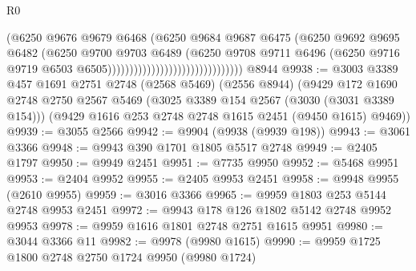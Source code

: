 \begin{lexlean}{R0}
\begin{coremodule}
                                                      (@6250
                                                        @9676
                                                        @9679
                                                        @6468
                                                        (@6250
                                                          @9684
                                                          @9687
                                                          @6475
                                                          (@6250
                                                            @9692
                                                            @9695
                                                            @6482
                                                            (@6250
                                                              @9700
                                                              @9703
                                                              @6489
                                                              (@6250
                                                                @9708
                                                                @9711
                                                                @6496
                                                                (@6250
                                                                  @9716
                                                                  @9719
                                                                  @6503
                                                                  @6505)))))))))))))))))))))))))))))))
    @8944
@9938 := @3003
    @3389
    @457
    @1691
    @2751
    @2748
    (@2568 @5469)
    (@2556 @8944)
    (@9429
      @172
      @1690
      @2748
      @2750
      @2567
      @5469
      (@3025 @3389 @154 @2567 (@3030 (@3031 @3389 @154)))
      (@9429 @1616 @253 @2748 @2748 @1615 @2451 (@9450 @1615) @9469))
@9939 := @3055 @2566
@9942 := @9904 (@9938 (@9939 @198))
@9943 := @3061 @3366
@9948 := @9943 @390 @1701 @1805 @5517 @2748
@9949 := @2405 @1797
@9950 := @9949 @2451
@9951 := @7735 @9950
@9952 := @5468 @9951
@9953 := @2404 @9952
@9955 := @2405 @9953 @2451
@9958 := @9948 @9955 (@2610 @9955)
@9959 := @3016 @3366
@9965 := @9959 @1803 @253 @5144 @2748 @9953 @2451
@9972 := @9943 @178 @126 @1802 @5142 @2748 @9952 @9953
@9978 := @9959 @1616 @1801 @2748 @2751 @1615 @9951
@9980 := @3044 @3366 @11
@9982 := @9978 (@9980 @1615)
@9990 := @9959 @1725 @1800 @2748 @2750 @1724 @9950 (@9980 @1724)

\end{coremodule}
\end{lexlean}
